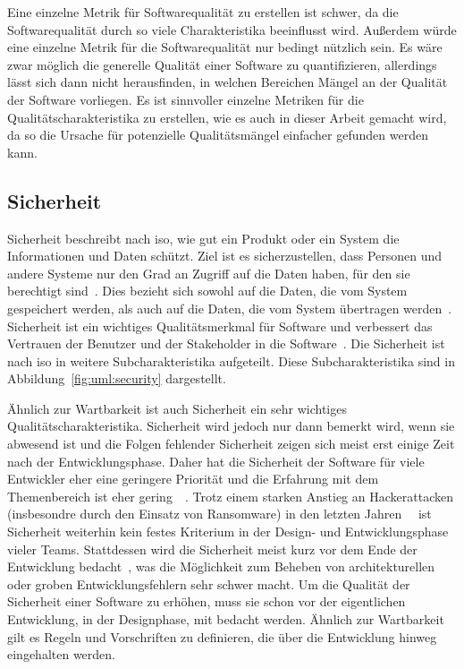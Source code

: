 \documentclass[12pt, a4paper, ngerman]{article}
\begin{document}
Eine einzelne Metrik für Softwarequalität zu erstellen ist schwer,
da die Softwarequalität durch so viele Charakteristika beeinflusst wird.
Außerdem würde eine einzelne Metrik für die Softwarequalität nur bedingt nützlich sein.
Es wäre zwar möglich die generelle Qualität einer Software zu quantifizieren,
allerdings lässt sich dann nicht herausfinden, 
in welchen Bereichen Mängel an der Qualität der Software vorliegen.
Es ist sinnvoller einzelne Metriken für die Qualitätscharakteristika
zu erstellen, wie es auch in dieser Arbeit gemacht wird,
da so die Ursache für potenzielle Qualitätsmängel
einfacher gefunden werden kann.

\subsection{Sicherheit}
\label{sec:sicherheit}

Sicherheit beschreibt nach \ac{iso}, wie gut ein Produkt oder ein System die Informationen und Daten schützt.
Ziel ist es sicherzustellen, dass Personen und andere Systeme nur den Grad an Zugriff auf die Daten haben, für den sie berechtigt sind~\cite{ISO25010}.
Dies bezieht sich sowohl auf die Daten, die vom System gespeichert werden, als auch auf die Daten, die vom System übertragen werden~\cite{ISO25010}.
Sicherheit ist ein wichtiges Qualitätsmerkmal für Software und verbessert das Vertrauen der Benutzer und der Stakeholder in die Software~\cite{ISO25010}.
Die Sicherheit ist nach \ac{iso} in weitere Subcharakteristika aufgeteilt.
Diese Subcharakteristika sind in Abbildung~\ref{fig:uml:security} dargestellt.

Ähnlich zur Wartbarkeit ist auch Sicherheit ein sehr wichtiges Qualitätscharakteristika.
Sicherheit wird jedoch nur dann bemerkt wird, wenn sie abwesend ist und 
die Folgen fehlender Sicherheit zeigen sich meist erst einige Zeit nach der Entwicklungsphase.
Daher hat die Sicherheit der Software für viele Entwickler eher eine geringere Priorität 
und die Erfahrung mit dem Themenbereich ist eher gering~\cite{Roshaidie_Liang_Jun_Yew_Fatima-Tuz-Zahra_2020}~\cite{Tahaei_Jenkins_Vaniea_Wolters_2021}.
Trotz einem starken Anstieg an Hackerattacken (insbesondre durch den Einsatz von Ransomware) 
in den letzten Jahren~\cite{BSI_2022}~\cite{Statistik_Cybersecurity_2022} ist Sicherheit weiterhin kein festes Kriterium 
in der Design- und Entwicklungsphase vieler Teams.
Stattdessen wird die Sicherheit meist kurz vor dem Ende der Entwicklung bedacht~\cite{Roshaidie_Liang_Jun_Yew_Fatima-Tuz-Zahra_2020}, 
was die Möglichkeit zum Beheben von architekturellen oder groben Entwicklungsfehlern sehr schwer macht.
Um die Qualität der Sicherheit einer Software zu erhöhen, muss sie schon vor der eigentlichen Entwicklung, 
in der Designphase, mit bedacht werden. Ähnlich zur Wartbarkeit gilt es Regeln und Vorschriften zu definieren, 
die über die Entwicklung hinweg eingehalten werden.
\end{document}
